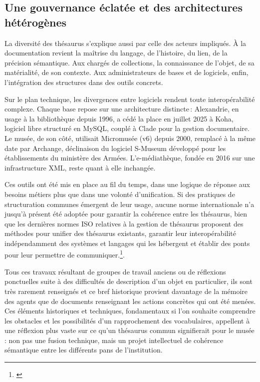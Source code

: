 \subsection{Une gouvernance éclatée et des architectures hétérogènes}

La diversité des thésaurus s’explique aussi par celle des acteurs impliqués. À la documentation revient la maîtrise du langage, de l'histoire, du lien, de la précision sémantique. Aux chargés de collections, la connaissance de l’objet, de sa matérialité, de son contexte. Aux administrateurs de bases et de logiciels, enfin, l’intégration des structures dans des outils concrets.

Sur le plan technique, les divergences entre logiciels rendent toute interopérabilité complexe. Chaque base repose sur une architecture distincte : Alexandrie, en usage à la bibliothèque depuis 1996, a cédé la place en juillet 2025 à Koha, logiciel libre structuré en MySQL, couplé à Clade pour la gestion documentaire. Le musée, de son côté, utilisait Micromusée (v6) depuis 2000, remplacé à la même date par Archange, déclinaison du logiciel S-Museum développé pour les établissements du ministère des Armées. L’e-médiathèque, fondée en 2016 sur une infrastructure XML, reste quant à elle inchangée.

Ces outils ont été mis en place au fil du temps, dans une logique de réponse aux besoins métiers plus que dans une volonté d’unification. Si des pratiques de structuration communes émergent de leur usage, aucune norme internationale n’a jusqu’à présent été adoptée pour garantir la cohérence entre les thésaurus, bien que les dernières normes ISO relatives à la gestion de thésaurus proposent des méthodes pour unifier des thésaurus existants, garantir leur interopérabilité indépendamment des systèmes et langages qui les hébergent et établir des ponts pour leur permettre de communiquer.\footnote{\cite{chichereauNormesConceptionGestion2007}}.

\bigskip

Tous ces travaux résultant de groupes de travail anciens ou de réflexions ponctuelles suite à des difficultés de description d'un objet en particulier, ils sont très rarement renseignés et ce bref historique provient davantage de la mémoire des agents que de documents renseignant les actions concrètes qui ont été menées. Ces éléments historiques et techniques,  fondamentaux si l’on souhaite comprendre les obstacles et les possibilités d’un rapprochement des vocabulaires, appellent à une réflexion plus vaste sur ce qu’un thésaurus commun signifierait pour le musée : non pas une fusion technique, mais un projet intellectuel de cohérence sémantique entre les différents pans de l’institution.